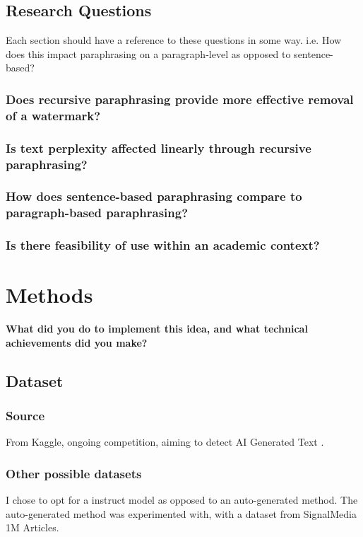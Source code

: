 \documentclass{l4proj}
\theoremstyle{definition}
\begin{document}
\section{Research Questions}
    Each section should have a reference to these questions in some way. i.e. How does this impact paraphrasing on a paragraph-level as opposed to sentence-based? 
    \subsection{Does recursive paraphrasing provide more effective removal of a watermark?}
    \subsection{Is text perplexity affected linearly through recursive paraphrasing?}
    \subsection{How does sentence-based paraphrasing compare to paragraph-based paraphrasing?}
    \subsection{Is there feasibility of use within an academic context?}
    
    
\chapter{Methods}
\textbf{What did you do to implement this idea, and what technical achievements did you make?}

\section{Dataset}
    \subsection{Source}
        From Kaggle, ongoing competition, aiming to detect AI Generated Text \citep{llm-detect-ai-generated-text}. 
    \subsection{Other possible datasets}
        I chose to opt for a instruct model as opposed to an auto-generated method. The auto-generated method was experimented with, with a dataset from SignalMedia 1M Articles. 
\end{document}
